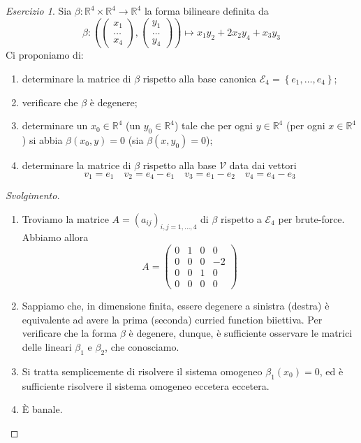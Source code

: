 \documentclass[a4paper]{amsproc}
\theoremstyle{plain}
\theoremstyle{definition}
\theoremstyle{remark}
\newtheorem{esercizio}{Esercizio}[section]
\newcommand{\pt}[1]{\left(\begin{smallmatrix}#1\end{smallmatrix}\right)}
\newcommand{\RR}{\mathbb R}
\begin{document}
\begin{esercizio}
  Sia $ \beta\colon\RR^4\times\RR^4\to\RR^4 $ la forma bilineare definita da
  \[
    \beta\colon\left(\pt{x_1\\\dots\\x_4},\pt{y_1\\\dots\\y_4}\right)\mapsto x_1y_2 + 2x_2y_4 + x_3y_3
  \]
  Ci proponiamo di:
  \begin{enumerate}
  \item determinare la matrice di $ \beta $ rispetto alla base canonica $ \mathcal E_4 = \left\{e_1,\dots,e_4\right\} $;
  \item verificare che $ \beta $ è degenere;
  \item determinare un $ x_0\in\RR^4 $ (un $ y_0\in\RR^4 $) tale che per ogni $ y\in\RR^4 $ (per ogni $ x\in\RR^4 $) si abbia $ \beta(x_0,y) = 0 $ (sia $ \beta(x,y_0) = 0 $);
  \item determinare la matrice di $ \beta $ rispetto alla base $ \mathcal V $ data dai vettori
    \[
      v_1 = e_1\quad v_2 = e_4 - e_1\quad v_3 = e_1 - e_2\quad v_4 = e_4 - e_3
    \]
  \end{enumerate}
\end{esercizio}
\begin{proof}[Svolgimento]
  \begin{enumerate}
  \item Troviamo la matrice $ A = \left(a_{ij}\right)_{i,j = 1,\dots,4} $ di $ \beta $ rispetto a $ \mathcal E_4 $ per brute-force. Abbiamo allora
  \[
    A = %
    \left(%
      \begin{smallmatrix}
        0 & 1 & 0 & 0\\
        0 & 0 & 0 & -2\\
        0 & 0 & 1 & 0\\
        0 & 0 & 0 & 0
      \end{smallmatrix}
    \right)
  \]
\item Sappiamo che, in dimensione finita, essere degenere a sinistra (destra) è equivalente ad avere la prima (seconda) curried function biiettiva. Per verificare che la forma $ \beta $ è degenere, dunque, è sufficiente osservare le matrici delle lineari $ \beta_1 $ e $ \beta_2 $, che conosciamo.
\item Si tratta semplicemente di risolvere il sistema omogeneo $ \beta_1(x_0) = 0 $, ed è sufficiente risolvere il sistema omogeneo eccetera eccetera.
\item È banale.
\end{enumerate}
\end{proof}
\smallskip
\end{document}
